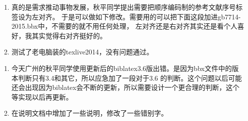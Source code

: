 \begin{enumerate}
\item 真的是需求推动事物发展，秋平同学提出需要把顺序编码制的参考文献序号标签设为左对齐。
于是可以做如下修改。需要用的可以把下面这段加进gb7714-2015.bbx中，不需要的就不用任何处理，
左对齐还是右对齐其实还是看个人喜好，我其实觉得右对齐挺好的。
\begin{texlist}
\end{texlist}

\item 测试了老电脑装的texlive2014，没有问题通过。
\end{enumerate}

\begin{enumerate}
\item 今天广州的秋平同学使用更新后的biblatex3.6版出错。是因为bbx文件中的版本判断只有3.4和其它，所以应急加了一段对于3.6 的判断。这个问题以后可能还会出现因为biblatex会不断的更新，所以需要设计一个更合理的判断，这个等实现以后再更新。

\item 在说明文档中增加了一些说明，修改了一些错别字。
\end{enumerate}

